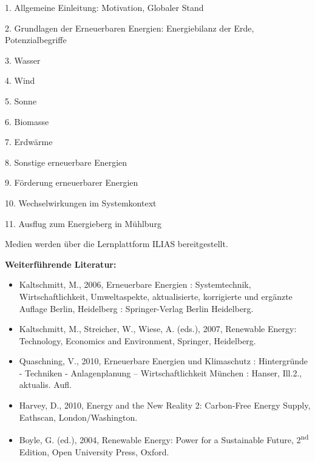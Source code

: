 \begin{course}
\begin{content}
1. Allgemeine Einleitung: Motivation, Globaler Stand

 

2. Grundlagen der Erneuerbaren Energien: Energiebilanz der Erde, Potenzialbegriffe

 

3. Wasser

 

4. Wind

 

5. Sonne

 

6. Biomasse

 

7. Erdwärme

 

8. Sonstige erneuerbare Energien

 

9. Förderung erneuerbarer Energien

 

10. Wechselwirkungen im Systemkontext

 

11. Ausflug zum Energieberg in Mühlburg


\end{content}

\begin{media}Medien werden über die Lernplattform ILIAS bereitgestellt.

\end{media}

\begin{literature}\textbf{Weiterführende Literatur:}

 \begin{itemize}\item Kaltschmitt, M., 2006, Erneuerbare Energien : Systemtechnik, Wirtschaftlichkeit, Umweltaspekte, aktualisierte, korrigierte und ergänzte Auflage Berlin, Heidelberg : Springer-Verlag Berlin Heidelberg.  \item Kaltschmitt, M., Streicher, W., Wiese, A. (eds.), 2007, Renewable Energy: Technology, Economics and Environment, Springer, Heidelberg.  \item Quaschning, V., 2010, Erneuerbare Energien und Klimaschutz : Hintergründe - Techniken - Anlagenplanung – Wirtschaftlichkeit München : Hanser, Ill.2., aktualis. Aufl.  \item Harvey, D., 2010, Energy and the New Reality 2: Carbon-Free Energy Supply, Eathscan, London/Washington.  \item Boyle, G. (ed.), 2004, Renewable Energy: Power for a Sustainable Future, 2\textsuperscript{nd} Edition, Open University Press, Oxford.  \end{itemize}\end{literature}



\end{course}
